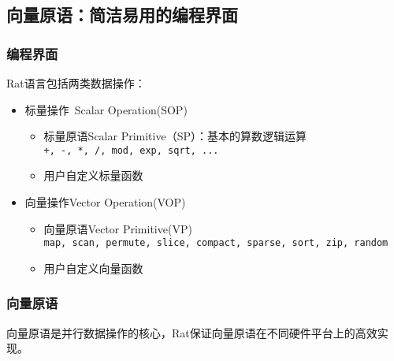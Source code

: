 \documentclass{beamer}
\begin{document}
\subsection{向量原语：简洁易用的编程界面}
\begin{frame}
  \frametitle{编程界面}
  Rat语言包括两类数据操作：
  \begin{itemize}
    \item<1-> 标量操作~Scalar Operation(SOP)
      \begin{itemize}
        \item 标量原语Scalar Primitive（SP）：基本的算数逻辑运算\\
          \texttt{+, -, *, /, mod, exp, sqrt, ...}
        \item 用户自定义标量函数
      \end{itemize}
    \item<2-> 向量操作Vector Operation(VOP)
      \begin{itemize}
        \item 向量原语Vector Primitive(VP)\\
          \texttt{map, scan, permute, slice, compact, sparse, sort, zip, random}
        \item 用户自定义向量函数
      \end{itemize}
  \end{itemize}
\end{frame}

\begin{frame}[t]
  \frametitle{向量原语}
  向量原语是并行数据操作的核心，Rat保证向量原语在不同硬件平台上的高效实现。
\end{frame}
\end{document}
